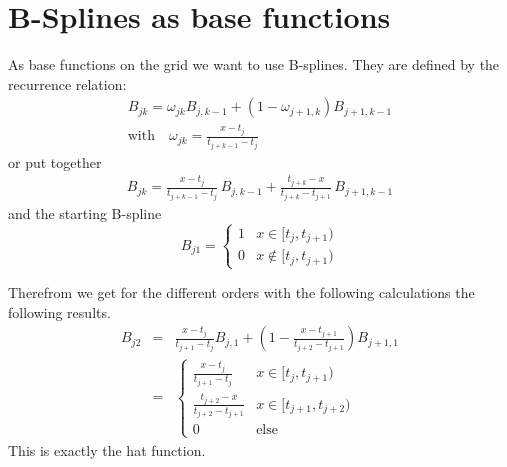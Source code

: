 \documentclass[12pt]{report}
\begin{document}
\chapter{B-Splines as base functions}
\label{sec:bsplines}

As base functions on the grid we want to use B-splines. They are
defined by the recurrence relation:
\begin{eqnarray*}
  B_{jk}=\omega_{jk}B_{j,k-1}+(1-\omega_{j+1,k})B_{j+1,k-1}\\
  \mbox{with}\quad\omega_{jk}=\frac{x-t_j}{t_{j+k-1}-t_j}
\end{eqnarray*}
or put together
\begin{eqnarray*}
  B_{jk}=\frac{x-t_j}{t_{j+k-1}-t_j}\,B_{j,k-1}
  +\frac{t_{j+k}-x}{t_{j+k}-t_{j+1}}\,B_{j+1,k-1}
\end{eqnarray*}
and the starting B-spline 
\begin{displaymath}
  B_{j1}=
  \begin{cases}
    1 & x\in[t_j,t_{j+1})\\
    0 & x\notin[t_j,t_{j+1})
  \end{cases}
\end{displaymath}

Therefrom we get for the different orders with the following
calculations the following results.
\begin{eqnarray*}
  B_{j2}&=&\frac{x-t_j}{t_{j+1}-t_j} B_{j,1}
  +\left(1-\frac{x-t_{j+1}}{t_{j+2}-t_{j+1}}\right)B_{j+1,1}\\
  &=&
  \begin{cases}
    \frac{x-t_j}{t_{j+1}-t_j} & x\in[t_j,t_{j+1})\\
    \frac{t_{j+2}-x}{t_{j+2}-t_{j+1}} & x\in[t_{j+1},t_{j+2})\\
    0 & \mbox{else}
  \end{cases}
\end{eqnarray*}
This is exactly the hat function.
\end{document}
